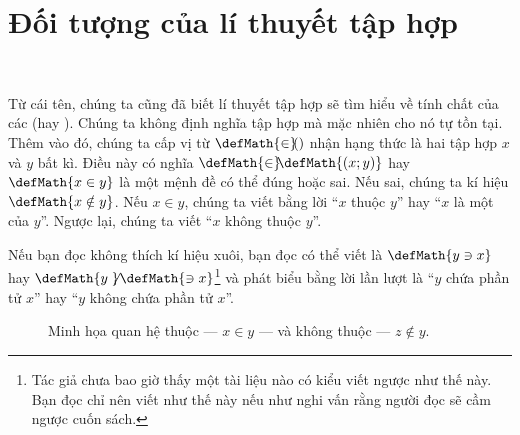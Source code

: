 \section{Đối tượng của lí thuyết tập hợp}

\

Từ cái tên, chúng ta cũng đã biết lí thuyết tập hợp sẽ tìm hiểu về tính chất của các  (hay ). Chúng ta không định nghĩa tập hợp mà mặc nhiên cho nó tự tồn tại. Thêm vào đó, chúng ta cấp vị từ $\defMath{\in}\hspace{-0.25em}()$ nhận hạng thức là hai tập hợp $x$ và $y$ bất kì. Điều này có nghĩa $\defMath{\in}\hspace{-0.25em}\defMath{(x; y)}$ hay $\defMath{x \in y}$ là một mệnh đề có thể đúng hoặc sai. Nếu sai, chúng ta kí hiệu $\defMath{x \notin y}$. Nếu $x \in y$, chúng ta viết bằng lời ``$x$ thuộc $y$'' hay ``$x$ là một  của $y$''. Ngược lại, chúng ta viết ``$x$ không thuộc $y$''.

Nếu bạn đọc không thích kí hiệu xuôi, bạn đọc có thể viết là $\defMath{y \ni x}$ hay $\defMath{y \not}\hspace{0.05em}\defMath{\ni x}$\footnote{Tác giả chưa bao giờ thấy một tài liệu nào có kiểu viết ngược như thế này. Bạn đọc chỉ nên viết như thế này nếu như nghi vấn rằng người đọc sẽ cầm ngược cuốn sách.} và phát biểu bằng lời lần lượt là ``$y$ chứa phần tử $x$'' hay ``$y$ không chứa phần tử $x$''.

\begin{figure}[H]
    \centering
    \caption{Minh họa quan hệ thuộc --- $x \in y$ --- và không thuộc --- $z \notin y$.}
\end{figure}